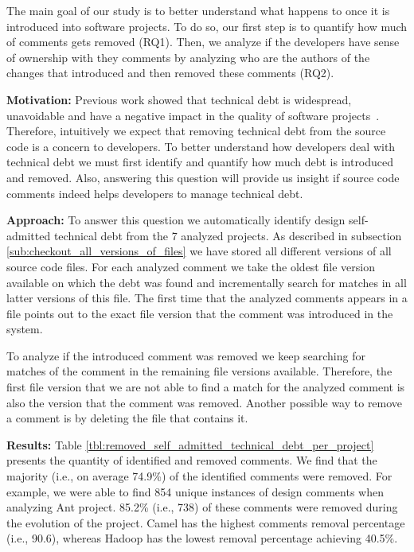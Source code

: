 The main goal of our study is to better understand what happens to \SATD once it is introduced into software projects. To do so, our first step is to quantify how much of \SATD comments gets removed (RQ1). Then, we analyze if the developers have sense of ownership with they \SATD comments by analyzing who are the authors of the changes that introduced and then removed these \SATD comments (RQ2). 

\vspace{3mm}
\noindent\rqi
\vspace{3mm}

\noindent \textbf{Motivation:} Previous work showed that technical debt is widespread, unavoidable and have a negative impact in the quality of software projects~\cite{Lim2012Software}. Therefore, intuitively we expect that removing technical debt from the source code is a concern to developers. To better understand how developers deal with technical debt we must first identify and quantify how much debt is introduced and removed. Also, answering this question will provide us insight if source code comments indeed helps developers to manage technical debt. 

\vspace{1mm}
\noindent \textbf{Approach:} To answer this question we automatically identify design self-admitted technical debt from the 7 analyzed projects. As described in subsection \ref{sub:checkout_all_versions_of_files} we have stored all different versions of all source code files. For each analyzed \SATD comment we take the oldest file version available on which the debt was found and incrementally search for matches in all latter versions of this file. The first time that the analyzed \SATD comments appears in a file points out to the exact file version that the \SATD comment was introduced in the system.

To analyze if the introduced \SATD comment was removed we keep searching for matches of the comment in the remaining file versions available. Therefore, the first file version that we are not able to find a match for the analyzed comment is also the version that the \SATD comment was removed. Another possible way to remove a \SATD comment is by deleting the file that contains it. 

\vspace{1mm}
\noindent \textbf{Results:} Table \ref{tbl:removed_self_admitted_technical_debt_per_project} presents the quantity of identified and removed \SATD comments. We find that the majority (i.e., on average 74.9\%) of the identified \SATD comments were removed. For example, we were able to find 854 unique instances of design \SATD comments when analyzing Ant project. 85.2\% (i.e., 738) of these \SATD comments were removed during the evolution of the project. Camel has the highest \SATD comments removal percentage (i.e., 90.6), whereas Hadoop has the lowest removal percentage achieving 40.5\%.


